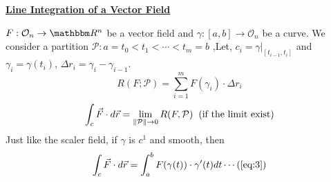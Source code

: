 \documentclass[Analysis-3]{subfiles}
\begin{document}
\begin{center}
    \large \underline{\textbf{Line Integration of a Vector Field} }
\end{center}

$F:\mathcal{O}_n \to \R^n$ be a vector field and $\gamma:[a,b] \to \mathcal{O}_n$ be a curve. We consider a partition $\mathcal{P}: a =t_0<t_1<\cdots < t_m=b$ ,Let, $c_i = \gamma|_{[t_{i-1},t_i]}$ and $\gamma_i = \gamma(t_i)$, $\Delta r_i = \gamma_{i} - \gamma_{i-1}$.
\[R(F;\mathcal{P})= \sum_{i=1}^m F(\gamma_i)\cdot \Delta r_i\]
\[\int_c \vec{F}\cdot d\vec{r} = \lim_{\norm{\mathcal{P}}\to 0} R(F,\mathcal{P}) \hspace{0.2cm}(\text{if the limit exist})\]
Just like the scaler field, if $\gamma$ is $c^1$ and smooth, then
\[\int_c \vec{F}\cdot d\vec{r} = \int_a^b F(\gamma(t))\cdot \gamma'(t) dt \label{eq:3} \cdots (\ref{eq:3})\]
\end{document}
